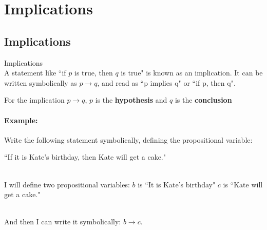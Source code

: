 
\newcommand{\laClass}       {CS 210}
\newcommand{\laSemester}    {Spring 2018}
\newcommand{\laChapter}     {1.5}
\newcommand{\laType}        {Exercise}
\newcommand{\laPoints}      {5}
\newcommand{\laTitle}       {Implications}
\newcommand{\laDate}        {}
\setcounter{chapter}{5}
\setcounter{section}{1}
\addtocounter{section}{-1}

\togglefalse{answerkey}






    \section{\laTitle}

    \subsection{Implications}

        \begin{intro}{Implications} ~\\
            A statement like ``if $p$ is true, then $q$ is true" is known
            as an implication. It can be written symbolically as $p \to q$,
            and read as ``p implies q" or ``if p, then q".

            For the implication $p \to q$, $p$ is the \textbf{hypothesis}
            and $q$ is the \textbf{conclusion}

            \paragraph{Example:} Write the following statement symbolically,
                defining the propositional variable:

                ``If it is Kate's birthday, then Kate will get a cake."

                ~\\ I will define two propositional variables:
                $b$ is ``It is Kate's birthday" \tab $c$ is ``Kate will get a cake."

                ~\\
                And then I can write it symbolically: $b \to c$.
        \end{intro}

